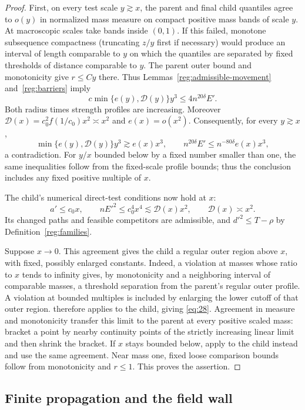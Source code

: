 \begin{proof}
First, on every test scale $y\gtrsim x$, the parent and final child
quantiles agree to $o(y)$ in normalized mass measure on compact
positive mass bands of scale $y$.  At macroscopic scales take bands
inside $(0,1)$.  If this failed, monotone subsequence compactness
(truncating $z/y$ first if necessary) would produce an interval of
length comparable to $y$ on which the quantiles are separated by
fixed thresholds of distance comparable to $y$.  The parent outer
bound and monotonicity give $r\le Cy$ there.  Thus
Lemmas~\ref{reg:admissible-movement} and~\ref{reg:barriers} imply
\[
 c\min\{e(y),\mathcal D(y)\}y^3\le4n^{20\delta}E'.
\]
Both radius times strength profiles are increasing.  Moreover
$\mathcal D(x)=c_0^2f(1/c_0)x^2\asymp x^2$ and $e(x)=o(x^2)$.
Consequently, for every $y\gtrsim x$,
\[
 \min\{e(y),\mathcal D(y)\}y^3
       \gtrsim e(x)x^3,
 \qquad
 n^{20\delta}E'\le n^{-80\delta}e(x)x^3,
\]
a contradiction.  For $y/x$ bounded below by a fixed number
smaller than one, the same inequalities follow from the fixed-scale
profile bounds; thus the conclusion includes any fixed positive
multiple of $x$.

The child's numerical direct-test conditions now hold at $x$:
\[
 a'\le c_0x,\qquad
 nE'^2\le c_0^4x^4\lesssim\mathcal D(x)x^2,
 \qquad \mathcal D(x)\asymp x^2.
\]
Its changed paths and feasible competitors are admissible, and
$d'^2\le T-\rho$ by Definition~\ref{reg:families}.

Suppose $x\to0$.  This agreement gives the child a regular outer
region above $x$, with fixed, possibly enlarged constants.  Indeed,
a violation at masses whose ratio to $x$ tends to infinity gives,
by monotonicity and a neighboring interval of comparable masses,
a threshold separation from the parent's regular outer profile.
A violation at bounded multiples is included by enlarging the
lower cutoff of that outer region.
 therefore applies to the
child, giving \eqref{eq:28}.  Agreement in measure and
monotonicity transfer this limit to the parent at every positive
scaled mass: bracket a point by nearby continuity points of the
strictly increasing linear limit and then shrink the bracket.
If $x$ stays bounded below, apply
 to the child instead and use
the same agreement.  Near mass one, fixed loose comparison bounds
follow from monotonicity and $r\le1$.  This proves the assertion.
\end{proof}

\subsection{Finite propagation and the field wall}

